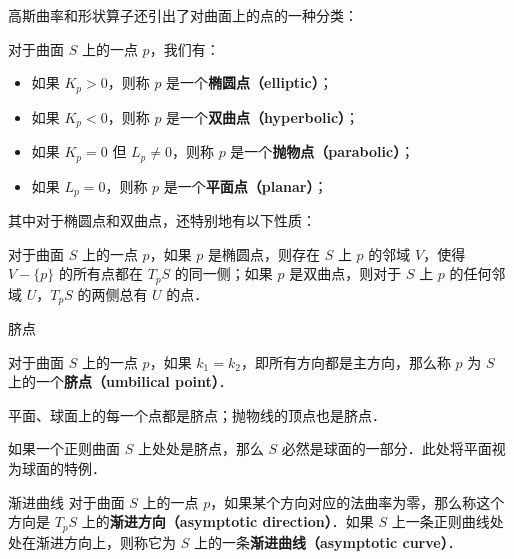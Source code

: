 高斯曲率和形状算子还引出了对曲面上的点的一种分类：

\begin{definition}{}
对于曲面 $S$ 上的一点 $p$，我们有：
\begin{itemize}
\item 如果 $K_p>0$，则称 $p$ 是一个\textbf{椭圆点（elliptic）}；
\item 如果 $K_p<0$，则称 $p$ 是一个\textbf{双曲点（hyperbolic）}；
\item 如果 $K_p=0$ 但 $L_p\not=0$，则称 $p$ 是一个\textbf{抛物点（parabolic）}；
\item 如果 $L_p=0$，则称 $p$ 是一个\textbf{平面点（planar）}；
\end{itemize}
\end{definition}

其中对于椭圆点和双曲点，还特别地有以下性质：
\begin{theorem}{}
对于曲面 $S$ 上的一点 $p$，如果 $p$ 是椭圆点，则存在 $S$ 上 $p$ 的邻域 $V$，使得 $V-\{p\}$ 的所有点都在 $T_pS$ 的同一侧；如果 $p$ 是双曲点，则对于 $S$ 上 $p$ 的任何邻域 $U$，$T_pS$ 的两侧总有 $U$ 的点．
\end{theorem}


\begin{definition}{脐点}

对于曲面 $S$ 上的一点 $p$，如果 $k_1=k_2$，即所有方向都是主方向，那么称 $p$ 为 $S$ 上的一个\textbf{脐点（umbilical point）}．

\end{definition}

平面、球面上的每一个点都是脐点；抛物线的顶点也是脐点．

\begin{theorem}{}
如果一个正则曲面 $S$ 上处处是脐点，那么 $S$ 必然是球面的一部分．此处将平面视为球面的特例．
\end{theorem}

\begin{definition}{渐进曲线}
对于曲面 $S$ 上的一点 $p$，如果某个方向对应的法曲率为零，那么称这个方向是 $T_pS$ 上的\textbf{渐进方向（asymptotic direction）}．如果 $S$ 上一条正则曲线处处在渐进方向上，则称它为 $S$ 上的一条\textbf{渐进曲线（asymptotic curve）}．


\end{definition}


